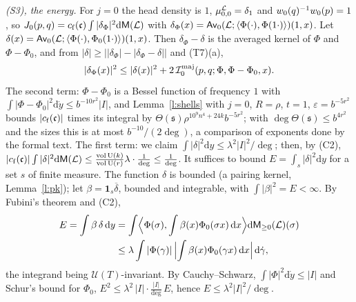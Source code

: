 \documentclass[11pt,a4paper]{article}
\makeatletter
\theoremstyle{plainx}
\theoremstyle{uprightx}
\renewenvironment{proof}[1][Proof]{\par\pushQED{\qed}\normalfont\topsep0pt\partopsep0pt
  \trivlist\item[\hskip\labelsep\itshape #1.]\ignorespaces}{\popQED\endtrivlist\@endpefalse}
\newcommand{\cL}{\mathcal{L}}
\newcommand{\dd}{\mathrm{d}}
\newcommand{\UT}[1]{\mathcal{U}(#1)}
\newcommand{\vol}{\operatorname{vol}}
\newcommand{\volU}[1]{\vol\mathrm{U}(#1)}
\newcommand{\bandc}[1]{\Theta(#1)}
\newcommand{\Inp}[1]{\textup{(#1)}}
\makeatother
\begin{document}
\begin{proof}[Proof of Theorem E]
\emph{\textup{(S3)}, the energy.} For $j=0$ the head density is $1$, $\stackMeasure{\cL}_{0,0}=\delta_1$ and
$\weylRatio{0}{p}{q}=1$, so $J_0(p,q)=\formConst{\mathfrak{c}}\int|\delta_\Phi|^2\dd\groupMeasure{\cL}$ with
$\delta_\Phi(x)=\upperPairing{\cL}{0}{\translatePairing{\Phi}{\Phi}{1}{\cdot}{\cdot}}{1}{x}$. Let
$\delta(x)=\upperPairing{\cL}{0}{\translatePairing{\Phi}{\Phi_0}{1}{\cdot}{\cdot}}{1}{x}$. Then
$\delta_\Phi-\delta$ is the averaged kernel of $\Phi$ and $\Phi-\Phi_0$, and from $|\delta|\ge\bigl||\delta_\Phi|-|\delta_\Phi-\delta|\bigr|$
and \Inp{T7}(a),
\[|\delta_\Phi(x)|^2\le|\delta(x)|^2+2\,\formMajorant{0}{p}{q}{\Phi}{\Phi-\Phi_0}{x}.\]
The second term: $\Phi-\Phi_0$ is a Bessel function of frequency $1$ with
$\int|\Phi-\Phi_0|^2\dd\dot y\le b^{-10r^2}|I|$, and Lemma~\ref{l:shells} with $j=0$, $R=\rho$, $t=1$,
$\varepsilon=b^{-5r^2}$ bounds $|\formConst{\mathfrak{c}}|$ times its integral by
$\bandc{\mathfrak{s}}\rho^{10^9n^4+24k}b^{-5r^2}$; with $\deg\bandc{\mathfrak{s}}\le b^{4r^2}$ and the sizes this is
at most $b^{-10}/(2\deg)$, a comparison of exponents done by the formal text. The first term: we claim
$\int|\delta|^2\dd y\le\lambda^2|I|^2/\deg$; then, by \Inp{C2},
$|\formConst{\mathfrak{c}}|\int|\delta|^2\dd\groupMeasure{\cL}\le\frac{\volU{k}}{\volU{r}}\lambda\cdot\frac1{\deg}\le\frac1{\deg}$.
It suffices to bound $E=\int_{s}|\delta|^2\dd y$ for a set $s$ of finite measure. The function $\delta$ is bounded
(a pairing kernel, Lemma~\ref{l:pk}); let $\beta=\mathbf{1}_s\overline{\delta}$, bounded and integrable, with
$\int|\beta|^2=E<\infty$. By Fubini's theorem and \Inp{C2},
\[\begin{aligned}E=\int\beta\,\delta\,\dd y&=\int\Bigl\langle\Phi(\sigma),\int\beta(x)\Phi_0(\sigma x)\,\dd x\Bigr\rangle\dd\upperMeasure{\cL}{0}(\sigma)\\
&\le\lambda\int|\Phi(\gamma)|\,\Bigl|\int\beta(x)\Phi_0(\gamma x)\,\dd x\Bigr|\,\dd\dot\gamma,\end{aligned}\]
the integrand being $\UT{T}$-invariant. By Cauchy--Schwarz, $\int|\Phi|^2\dd\dot y\le|I|$ and Schur's bound for
$\Phi_0$, $E^2\le\lambda^2\,|I|\cdot\frac{|I|}{\deg}\,E$, hence $E\le\lambda^2|I|^2/\deg$.
\end{proof}
\end{document}

